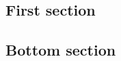 \documentclass[a4paper, 11pt]{article}
\begin{document}
\onecolumn
\begin{multicols}{1}
\section{First section}
\lipsum[2]
\end{multicols}

\begin{multicols}{2}



%
\section{Bottom section}
\lipsum[2]
\end{multicols}
\end{document}
